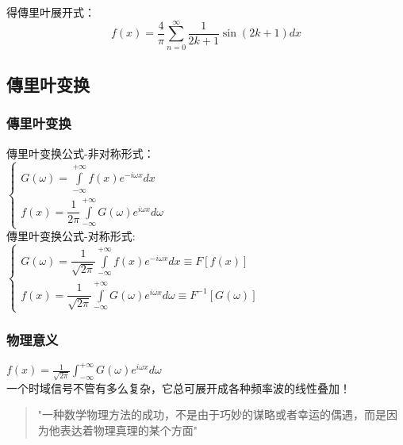 \begin{frame}
	得傳里叶展开式：
	\begin{equation*}
		f(x) = \dfrac{4}{\pi} \sum_{n=0}^{\infty}  \dfrac{1}{2k+1} \sin(2k+1) dx  
	\end{equation*}       
\end{frame}

\subsection{傳里叶变换 }

\begin{frame}
\frametitle{傳里叶变换 }
	傳里叶变换公式-非对称形式：\\
	$\displaystyle \begin{cases}
		G(\omega) =\int\limits_{-\infty}^{+\infty}  f(x) e^{-i\omega x} dx \\
		f(x) =\dfrac{1}{2\pi} \int\limits_{-\infty}^{+\infty}  G(\omega) e^{i\omega x} d\omega
	\end{cases}$ \\ \vspace{0.3cm}
	{傳里叶变换公式-对称形式:}\\ 
	$\displaystyle \begin{cases}
		G(\omega) =\dfrac{1}{\sqrt{2\pi}} \int\limits_{-\infty}^{+\infty}  f(x) e^{-i\omega x} dx  \equiv F[f(x)]\\
		f(x) =\dfrac{1}{\sqrt{2\pi}}  \int\limits_{-\infty}^{+\infty}  G(\omega) e^{i\omega x} d\omega  \equiv F^{-1}[G(\omega)]
	\end{cases}$ \\	
\end{frame}

\begin{frame}
	\frametitle{物理意义}
	{\Large   $\displaystyle f(x) =\frac{1}{\sqrt{2\pi}}  \int_{-\infty}^{+\infty}  G(\omega) e^{i\omega x} d\omega $ }\\	\vspace{0.3cm}
	一个时域信号不管有多么复杂，它总可展开成各种频率波的线性叠加！	\\ \vspace{0.3cm}
	\begin{quote} \noindent
	"一种数学物理方法的成功，不是由于巧妙的谋略或者幸运的偶遇，而是因为他表达着物理真理的某个方面"
	~~\\
	\end{quote}
	
\end{frame}

